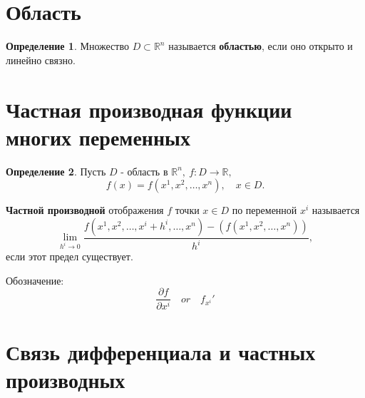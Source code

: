 \documentclass{report}
\theoremstyle{definition}
\newtheorem*{definition}{Определение}
\begin{document}
\section{Область}

\begin{definition}
    Множество $D\subset\mathbb{R}^n$ называется \textbf{областью}, если оно открыто и линейно связно.
\end{definition}

\section{Частная производная функции многих переменных}

\begin{definition}
    Пусть $D$ - область в $\mathbb{R}^n, \ f:D\rightarrow\mathbb{R},$
    \begin{equation*}
        f(x) = f(x^1,x^2,\ldots,x^n), \quad x \in D.
    \end{equation*}

    \textbf{Частной производной} отображения $f$ точки $x \in D$ по переменной $x^i$ называется
    \begin{equation*}
        \underset{h^i\rightarrow 0}{\lim}\frac{f(x^1,x^2,\ldots,x^i + h^i, \ldots,x^n) - (f(x^1,x^2,\ldots,x^n))}{h^i},
    \end{equation*}
    если этот предел существует.

    Обозначение:
    \begin{equation*}
        \frac{\partial f}{\partial x^i} \quad or \quad f_{x^i}'
    \end{equation*}
\end{definition}

\section{Связь дифференциала и частных производных}
\end{document}
